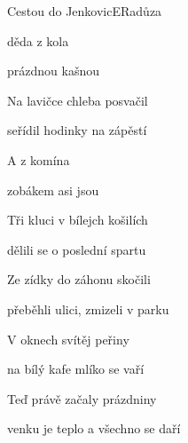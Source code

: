 \setcounter{page}{14}
\begin{song}{Cestou do Jenkovic}{E}{Radůza}

\begin{SBVerse}

 děda z kola 

 prázdnou kašnou 

Na lavičce chleba posvačil

seřídil hodinky na zápěstí

\end{SBVerse}

\begin{SBChorus}

A  z komína 

zobákem  asi jsou 

\end{SBChorus}

\begin{SBVerse}

Tři kluci v bílejch košilích

dělili se o poslední spartu

Ze zídky do záhonu skočili

přeběhli ulici, zmizeli v parku

\end{SBVerse}

\begin{SBChorus}

\end{SBChorus}

\begin{SBVerse}

V oknech svítěj peřiny

na bílý kafe mlíko se vaří

Teď právě začaly prázdniny

venku je teplo a všechno se daří

\end{SBVerse}

\begin{SBChorus}

\end{SBChorus}

\end{song}

\clearpage
